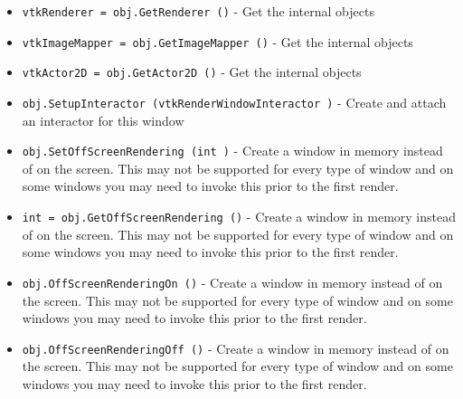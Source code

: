 \begin{itemize}
\item  \verb|vtkRenderer = obj.GetRenderer ()| -  Get the internal objects

\item  \verb|vtkImageMapper = obj.GetImageMapper ()| -  Get the internal objects

\item  \verb|vtkActor2D = obj.GetActor2D ()| -  Get the internal objects

\item  \verb|obj.SetupInteractor (vtkRenderWindowInteractor )| -  Create and attach an interactor for this window

\item  \verb|obj.SetOffScreenRendering (int )| -  Create a window in memory instead of on the screen. This may not
 be supported for every type of window and on some windows you may
 need to invoke this prior to the first render.

\item  \verb|int = obj.GetOffScreenRendering ()| -  Create a window in memory instead of on the screen. This may not
 be supported for every type of window and on some windows you may
 need to invoke this prior to the first render.

\item  \verb|obj.OffScreenRenderingOn ()| -  Create a window in memory instead of on the screen. This may not
 be supported for every type of window and on some windows you may
 need to invoke this prior to the first render.

\item  \verb|obj.OffScreenRenderingOff ()| -  Create a window in memory instead of on the screen. This may not
 be supported for every type of window and on some windows you may
 need to invoke this prior to the first render.

\end{itemize}
